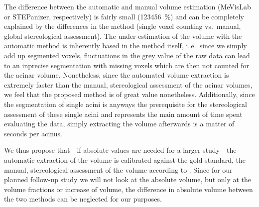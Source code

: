 \documentclass[%
	twoside,
	paper=a4,%
	abstract=true,%
	]{scrartcl}
\newcommand{\ie}{i.\,e.\ }
\newcommand{\difference}{123456}
\begin{document}
The difference between the automatic and manual volume estimation (MeVisLab or STEPanizer, respectively) is fairly small (\SI{\difference}{\percent}) and can be completely explained by the differences in the method (single voxel counting vs.\ manual, global stereological assessment). The under-estimation of the volume with the automatic method is inherently based in the method itself, \ie since we simply add up segmented voxels, fluctuations in the grey value of the raw data can lead to an inprecise segmentation with missing voxels which are then not counted for the acinar volume. Nonetheless, since the automated volume extraction is extremely faster than the manual, stereological assessment of the acinar volumes, we feel that the proposed method is of great value nonetheless. Additionally, since the segmentation of single acini is anyways the prerequisite for the stereological assessment of these single acini and represents the main amount of time spent evaluating the data, simply extracting the volume afterwards is a matter of seconds per acinus.

We thus propose that---if absolute values are needed for a larger study---the automatic extraction of the volume is calibrated against the gold standard, the manual, stereological assessment of the volume according to \citet{Hsia2010}. Since for our planned follow-up study we will not look at the absolute volume, but only at the volume fractions or increase of volume, the difference in absolute volume between the two methods can be neglected for our purposes.
\end{document}
